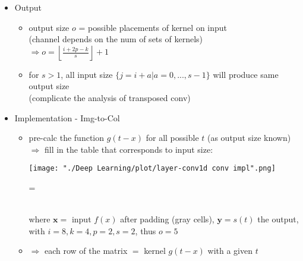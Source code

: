 \begin{itemize}
\begin{itemize}
\begin{itemize}
		\end{itemize}
	\item Output
		\begin{itemize}
		\item output size $o$ = possible placements of kernel on input \\
		(channel depends on the num of sets of kernels) \\
		$\displaystyle \Rightarrow o = \left\lfloor\frac {i+2p-k} {s} \right\rfloor + 1$
		\item for $s>1$, all input size $\{j=i+a | a = 0,...,s-1\}$ will produce same output size \\
		(complicate the analysis of transposed conv)
		\end{itemize}
	\item Implementation - Img-to-Col
		\begin{itemize}
		\item pre-calc the function $g(t-x)$ for all possible $t$ (as output size known) \\
		$\Rightarrow$ fill in the table that corresponds to input size: \\
		\begin{minipage}[r]{.3\linewidth}
		\texttt{[image: "./Deep Learning/plot/layer-conv1d conv impl".png]} \\
		\end{minipage}
		\begin{minipage}[l]{.4\linewidth}
		= 
		\end{minipage} \\
		where $\mathbf x = $ input $f(x)$ after padding (gray cells), $\mathbf y = s(t)$ the output, \\
		with $i=8, k=4, p=2, s=2$, thus $o=5$
		\item $\Rightarrow$ each row of the matrix $=$ kernel $g(t-x)$ with a given $t$ \\

\end{itemize}
\end{itemize}
\end{itemize}
